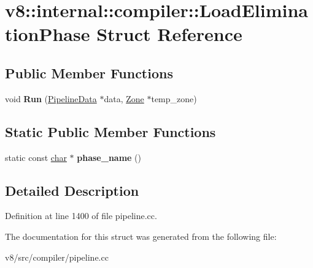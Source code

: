 \hypertarget{structv8_1_1internal_1_1compiler_1_1LoadEliminationPhase}{}\section{v8\+:\+:internal\+:\+:compiler\+:\+:Load\+Elimination\+Phase Struct Reference}
\label{structv8_1_1internal_1_1compiler_1_1LoadEliminationPhase}
\subsection*{Public Member Functions}
\begin{DoxyCompactItemize}
\item 
\mbox{\label{structv8_1_1internal_1_1compiler_1_1LoadEliminationPhase_a883af38661cae7258adfa3f618514a47}} 
void {\bfseries Run} (\mbox{\hyperlink{classv8_1_1internal_1_1compiler_1_1PipelineData}{Pipeline\+Data}} $\ast$data, \mbox{\hyperlink{classv8_1_1internal_1_1Zone}{Zone}} $\ast$temp\+\_\+zone)
\end{DoxyCompactItemize}
\subsection*{Static Public Member Functions}
\begin{DoxyCompactItemize}
\item 
\mbox{\label{structv8_1_1internal_1_1compiler_1_1LoadEliminationPhase_a0b90644ccac4d6ea926e222982024699}} 
static const \mbox{\hyperlink{classchar}{char}} $\ast$ {\bfseries phase\+\_\+name} ()
\end{DoxyCompactItemize}


\subsection{Detailed Description}


Definition at line 1400 of file pipeline.\+cc.



The documentation for this struct was generated from the following file\+:\begin{DoxyCompactItemize}
\item 
v8/src/compiler/pipeline.\+cc\end{DoxyCompactItemize}
